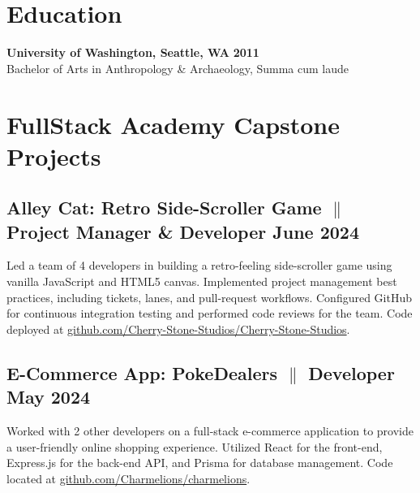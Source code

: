 \documentclass[a4paper,9pt]{article}
\begin{document}
\section{Education}
\textbf{University of Washington, Seattle, WA} \hfill
\textbf{2011}
\\
Bachelor of Arts in Anthropology \& Archaeology, Summa cum laude

\section{FullStack Academy Capstone Projects}

\subsection{Alley Cat: Retro Side-Scroller Game {$\parallel$}{
                  Project Manager
                  \& Developer}
      \hfill \textbf{June 2024}}
{Led a team of 4 developers in building a retro-feeling
      side-scroller game using vanilla JavaScript and HTML5 canvas.
      Implemented
      project management best practices, including tickets, lanes, and
      pull-request
      workflows. Configured GitHub for continuous integration testing and
      performed
      code reviews for the team. Code deployed at \href{https://github.com/Cherry-Stone-Studios/Cherry-Stone-Studios}{github.com/Cherry-Stone-Studios/Cherry-Stone-Studios}.}

\subsection{E-Commerce App: PokeDealers {$\parallel$}{ Developer}
      \hfill \textbf{May 2024}}
{Worked with 2 other developers on a full-stack e-commerce
      application
      to provide a user-friendly
      online shopping experience. Utilized React for the
      front-end, Express.js for
      the back-end API, and Prisma for database management. Code located
      at \href{https://github.com/Charmelions/charmelions}{github.com/Charmelions/charmelions}.}
\end{document}
